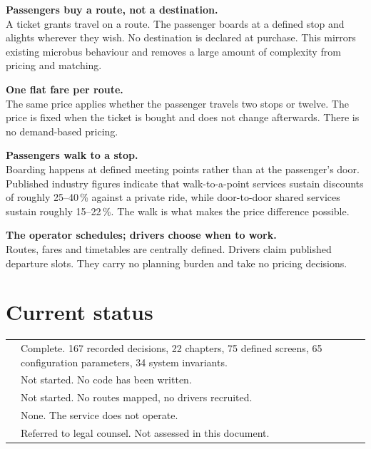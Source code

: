 \begin{keybox}
 \textbf{Passengers buy a route, not a destination.}\\
A ticket grants travel on a route. The passenger boards at a defined stop and alights wherever they
wish. No destination is declared at purchase. This mirrors existing microbus behaviour and removes
a large amount of complexity from pricing and matching.

\vspace{5pt}
 \textbf{One flat fare per route.}\\
The same price applies whether the passenger travels two stops or twelve. The price is fixed when
the ticket is bought and does not change afterwards. There is no demand-based pricing.

\vspace{5pt}
 \textbf{Passengers walk to a stop.}\\
Boarding happens at defined meeting points rather than at the passenger's door. Published industry
figures indicate that walk-to-a-point services sustain discounts of roughly 25--40\,\% against a
private ride, while door-to-door shared services sustain roughly 15--22\,\%. The walk is what makes
the price difference possible.

\vspace{5pt}
 \textbf{The operator schedules; drivers choose when to work.}\\
Routes, fares and timetables are centrally defined. Drivers claim published departure slots. They
carry no planning burden and take no pricing decisions.
\end{keybox}

\section{Current status}

\begin{center}
\begin{tabularx}{\textwidth}{@{}L{52mm}Y@{}}
\toprule
{} & Complete. 167 recorded decisions, 22 chapters, 75 defined screens, 65 configuration parameters, 34 system invariants. \\
 & Not started. No code has been written. \\
 & Not started. No routes mapped, no drivers recruited. \\
 & None. The service does not operate. \\
 & Referred to legal counsel. Not assessed in this document. \\
\bottomrule
\end{tabularx}
\end{center}

